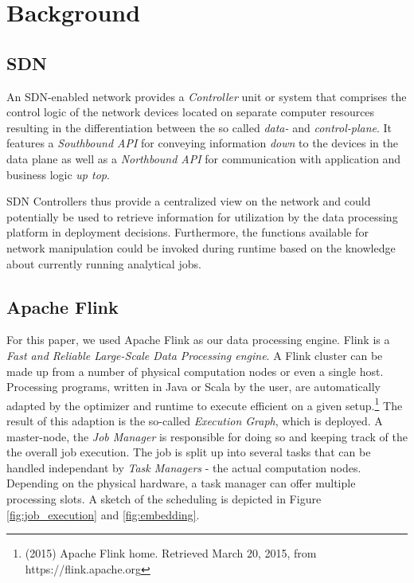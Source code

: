 \section{Background}
\subsection{SDN}
An SDN-enabled network provides a \textit{Controller} unit or system that comprises the control
logic of the network devices located on separate computer resources resulting in the differentiation
between the so called \textit{data-} and \textit{control-plane}. It features a \textit{Southbound
API} for conveying information \emph{down} to the devices in the data plane as well as a
\textit{Northbound API} for communication with application and business logic \emph{up top}.

SDN Controllers thus provide a centralized view on the network and could potentially be used to
retrieve information for utilization by the data processing platform in deployment decisions.
Furthermore, the functions available for network manipulation could be invoked during runtime based
on the knowledge about currently running analytical jobs.

\subsection{Apache Flink}
For this paper, we used Apache Flink as our data processing engine. Flink is a \textit{Fast and
Reliable Large-Scale Data Processing engine}. A Flink cluster can be made up from a number of
physical computation nodes or even a single host. Processing programs, written in Java or Scala by
the user, are automatically adapted by the optimizer and runtime to execute efficient on a given
setup.\footnote{(2015) Apache Flink home. Retrieved March 20, 2015, from https://flink.apache.org}
The result of this adaption is the so-called \textit{Execution Graph}, which is deployed. A
master-node, the \textit{Job Manager} is responsible for doing so and keeping track of the the
overall job execution. The job is split up into several tasks that can be handled independant by
\textit{Task Managers} - the actual computation nodes. Depending on the physical hardware, a task
manager can offer multiple processing slots. A sketch of the scheduling is depicted in Figure
\ref{fig:job_execution} and \ref{fig:embedding}.

